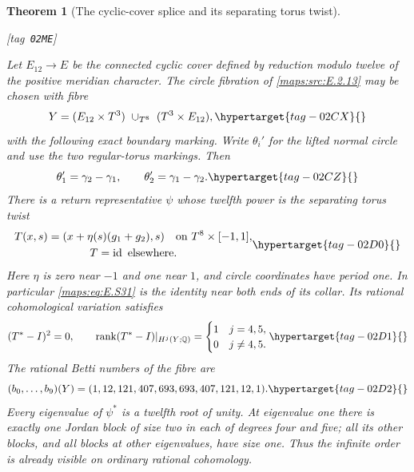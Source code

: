 \documentclass[11pt,a4paper]{article}
\numberwithin{equation}{section}
\newtheorem{theorem}{Theorem}[section]
\theoremstyle{definition}
\newcommand{\StatementRecord}[4]{{\upshape\footnotesize[tag~\texttt{#3}]}\enspace\ignorespaces}
\begin{document}
\begin{theorem}[The cyclic-cover splice and its separating torus twist]\hypertarget{tag-02ME}{}\label{maps:src:E.2.14}
\StatementRecord{maps:src:E.2.14}{proved}{02ME}{\cref{maps:src:E.2.13}, \cref{maps:src:E.2.6}, \cref{maps:src:E.2.10}, \eqref{maps:eq:E.S34}, \eqref{maps:eq:E.S35}, \eqref{maps:eq:E.S37}, \eqref{maps:eq:E.S39}, \eqref{maps:eq:E.S38}, \eqref{maps:eq:E.S41}, \eqref{maps:eq:E.S43}, \eqref{maps:eq:E.S36}, \eqref{maps:eq:E.S40}, \eqref{maps:eq:E.S44}, \eqref{maps:eq:E.S45}, \cref{maps:src:E.2.7}, \eqref{maps:eq:E.S47}, \eqref{maps:eq:E.S46}}


Let $E_{12}\to E$ be the connected cyclic cover defined by
reduction modulo twelve of the positive meridian character.
The circle fibration of \ref{maps:src:E.2.13} may be chosen with fibre
\begin{equation}
 Y=(E_{12}\times T^3)\ \cup_{T^8}\ (T^3\times E_{12}),
 \hypertarget{tag-02CX}{}\label{maps:eq:E.S29}
\end{equation}
with the following exact boundary marking. Write
$\theta_i'$ for the lifted normal circle and use the
two regular-torus markings. Then
\begin{equation}
       \theta_1'=\gamma_2-\gamma_1,\qquad
       \theta_2'=\gamma_1-\gamma_2.
 \hypertarget{tag-02CZ}{}\label{maps:eq:E.S30}
\end{equation}
There is a return representative $\psi$ whose twelfth power
is the separating torus twist
\begin{equation}
 \begin{gathered}
 T(x,s)=(x+\eta(s)(g_1+g_2),s)\quad\hbox{on }T^8\times[-1,1],
 \\
 T=\operatorname{id}\text{ elsewhere}.
 \end{gathered}
 \hypertarget{tag-02D0}{}\label{maps:eq:E.S31}
\end{equation}
Here $\eta$ is zero near $-1$ and one near $1$, and circle
coordinates have period one. In particular \eqref{maps:eq:E.S31} is the
identity near both ends of its collar. Its rational
cohomological variation satisfies
\begin{equation}
 (T^*-I)^2=0,\qquad
 \operatorname{rank}(T^*-I)|_{H^j(Y;\mathbb Q)}=
 \begin{cases}1&j=4,5,\\0&j\ne4,5.\end{cases}
 \hypertarget{tag-02D1}{}\label{maps:eq:E.S32}
\end{equation}
The rational Betti numbers of the fibre are
\begin{equation}
       (b_0,\ldots,b_9)(Y)
          =(1,12,121,407,693,693,407,121,12,1).
 \hypertarget{tag-02D2}{}\label{maps:eq:E.S33}
\end{equation}
Every eigenvalue of $\psi^*$ is a twelfth root of unity.
At eigenvalue one there is exactly one Jordan block of
size two in each of degrees four and five; all its other
blocks, and all blocks at other eigenvalues, have size one.
Thus the infinite order is already visible on ordinary
rational cohomology. \end{theorem}
\end{document}
